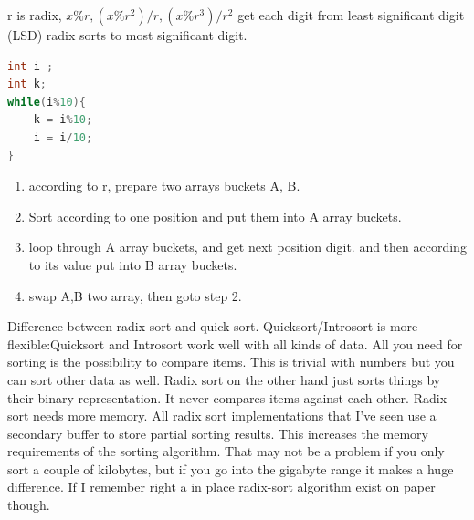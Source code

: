 \documentclass[a4paper,11pt,twoside]{book}
\begin{document}
	\par r is radix, $x\%r, (x\%r^{2})/r, (x\%r^{3})/r^{2}$  get each digit from least significant digit (LSD) radix sorts to most significant digit. 
	
\begin{lstlisting}[frame=single, language=c++]
int i ;
int k;
while(i%10){
	k = i%10;
	i = i/10;
}	
\end{lstlisting}	
	
	\begin{enumerate}
		\item according to r, prepare two arrays buckets A, B. 
		\item Sort according to one position and put them into A array buckets. 
		\item loop through A array buckets, and get next position digit. and then according to its value put into B array buckets.
		\item swap A,B two array, then goto step 2.
	\end{enumerate}
	
	\par Difference between radix sort and quick sort. Quicksort/Introsort is more flexible:Quicksort and Introsort work well with all kinds of data. All you need for sorting is the possibility to compare items. This is trivial with numbers but you can sort other data as well. Radix sort on the other hand just sorts things by their binary representation. It never compares items against each other. Radix sort needs more memory. All radix sort implementations that I've seen use a secondary buffer to store partial sorting results. This increases the memory requirements of the sorting algorithm. That may not be a problem if you only sort a couple of kilobytes, but if you go into the gigabyte range it makes a huge difference. If I remember right a in place radix-sort algorithm exist on paper though.
	
\end{document}
